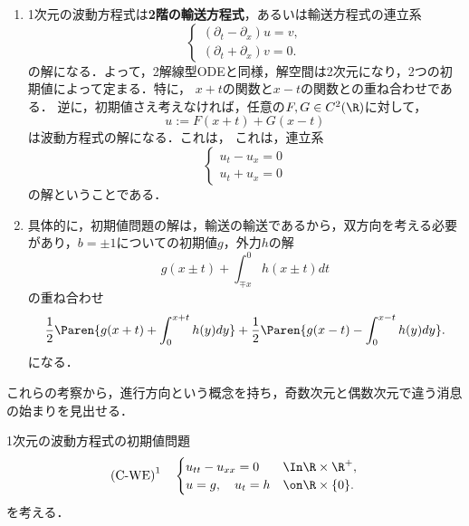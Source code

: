 \documentclass[uplatex,dvipdfmx]{jsreport}
\begin{document}
\begin{tcolorbox}[colframe=ForestGreen, colback=ForestGreen!10!white,breakable,colbacktitle=ForestGreen!40!white,coltitle=black,fonttitle=\bfseries\sffamily,
title=]
    \begin{enumerate}
        \item 1次元の波動方程式は\textbf{2階の輸送方程式}，あるいは輸送方程式の連立系
        \[\begin{cases}
            (\partial_t-\partial_x)u=v,\\
            (\partial_t+\partial_x)v=0.
        \end{cases}\]
        の解になる．よって，2解線型ODEと同様，解空間は2次元になり，2つの初期値によって定まる．特に，
        $x+t$の関数と$x-t$の関数との重ね合わせである．
        逆に，初期値さえ考えなければ，任意の$F,G\in C^2(\R)$に対して，
        \[u:=F(x+t)+G(x-t)\]
        は波動方程式の解になる．これは，
        これは，連立系
        \[\begin{cases}
            u_t-u_x=0\\
            u_t+u_x=0
        \end{cases}\]
        の解ということである．
        \item 具体的に，初期値問題の解は，輸送の輸送であるから，双方向を考える必要があり，$b=\pm1$についての初期値$g$，外力$h$の解
        \[g(x\pm t)+\int_{\mp x}^0h(x\pm t)dt\]
        の重ね合わせ
        \[\frac{1}{2}\Paren{g(x+t)+\int^{x+t}_0h(y)dy}+\frac{1}{2}\Paren{g(x-t)-\int^{x-t}_0h(y)dy}.\]
        になる．
    \end{enumerate}
    これらの考察から，進行方向という概念を持ち，奇数次元と偶数次元で違う消息の始まりを見出せる．
\end{tcolorbox}

\begin{problem}
    1次元の波動方程式の初期値問題
    \[\text{(C-WE)}^1\quad\begin{cases}
        u_{tt}-u_{xx}=0&\In \R\times\R^+,\\
        u=g,\quad u_t=h&\on \R\times\{0\}.
    \end{cases}\]
    を考える．
\end{problem}
\end{document}
